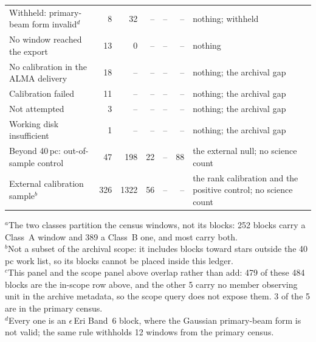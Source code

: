 \begin{tabular}{@{}p{}rrrrrp{}@{}}
\hspace{2.2em}Withheld: primary-beam form invalid$^{d}$ & 8 & 32 & -- & -- & -- & nothing; withheld \\
\hspace{2.2em}No window reached the export & 13 & 0 & -- & -- & -- & nothing \\
\hspace{1.1em}No calibration in the ALMA delivery & 18 & -- & -- & -- & -- & nothing; the archival gap \\
\hspace{1.1em}Calibration failed & 11 & -- & -- & -- & -- & nothing; the archival gap \\
\hspace{1.1em}Not attempted & 3 & -- & -- & -- & -- & nothing; the archival gap \\
\hspace{1.1em}Working disk insufficient & 1 & -- & -- & -- & -- & nothing; the archival gap \\
\hline
Beyond 40\,pc: out-of-sample control & 47 & 198 & 22 & -- & 88 & the external null; no science count \\
External calibration sample$^{b}$ & 326 & 1322 & 56 & -- & -- & the rank calibration and the positive control; no science count \\
\hline
\end{tabular}

{\footnotesize $^{a}$The two classes partition the census windows, not its blocks: 252 blocks carry a Class~A window and 389 a Class~B one, and most carry both.\\ $^{b}$Not a subset of the archival scope: it includes blocks toward stars outside the 40\,pc work list, so its blocks cannot be placed inside this ledger.\\ $^{c}$This panel and the scope panel above overlap rather than add: 479 of these 484 blocks are the in-scope row above, and the other 5 carry no member observing unit in the archive metadata, so the scope query does not expose them. 3 of the 5 are in the primary census.\\ $^{d}$Every one is an $\epsilon$\,Eri Band~6 block, where the Gaussian primary-beam form is not valid; the same rule withholds 12 windows from the primary census.}
